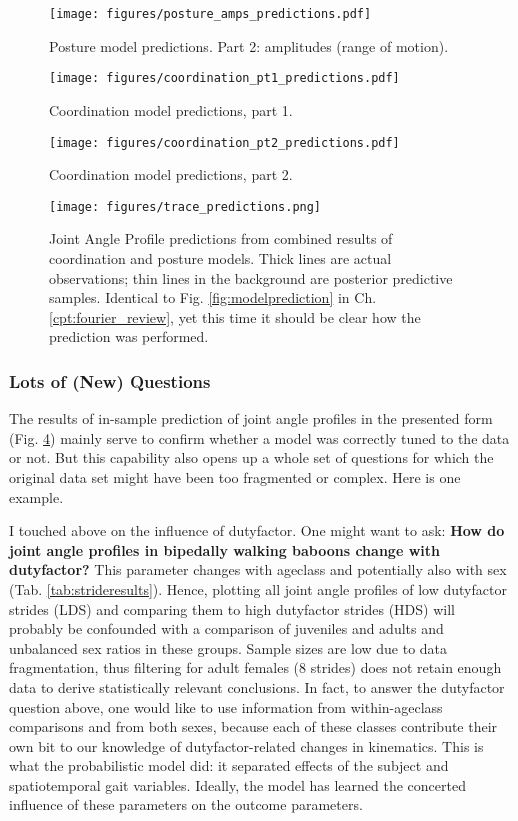 \begin{figure}[h!]
\centering
\texttt{[image: figures/posture\_amps\_predictions.pdf]}
\caption{\label{fig:posture2}Posture model predictions. Part 2: amplitudes (range of motion).}
\end{figure}

\begin{figure}[h!]
\centering
\texttt{[image: figures/coordination\_pt1\_predictions.pdf]}
\caption{\label{fig:coordination1}Coordination model predictions, part 1.}
\end{figure}

\begin{figure}[h!]
\centering
\texttt{[image: figures/coordination\_pt2\_predictions.pdf]}
\caption{\label{fig:coordination2}Coordination model predictions, part 2.}
\end{figure}


\begin{figure}[h!]
\centering
\texttt{[image: figures/trace\_predictions.png]}
\caption{\label{fig:japprediction}Joint Angle Profile predictions from combined results of coordination and posture models. Thick lines are actual observations; thin lines in the background are posterior predictive samples. Identical to Fig. \ref{fig:modelprediction} in Ch. \ref{cpt:fourier_review}, yet this time it should be clear how the prediction was performed.}
\end{figure}


\FloatBarrier\clearpage
\subsubsection{Lots of (New) Questions}
\label{sec:orgc1e641b}
The results of in-sample prediction of joint angle profiles in the presented form (Fig. \ref{fig:japprediction}) mainly serve to confirm whether a model was correctly tuned to the data or not.
But this capability also opens up a whole set of questions for which the original data set might have been too fragmented or complex.
Here is one example.


I touched above on the influence of dutyfactor.
One might want to ask:
\textbf{How do joint angle profiles in bipedally walking baboons change with dutyfactor?}
This parameter changes with ageclass and potentially also with sex (Tab. \ref{tab:strideresults}).
Hence, plotting all joint angle profiles of low dutyfactor strides (LDS) and comparing them to high dutyfactor strides (HDS) will probably be confounded with a comparison of juveniles and adults and unbalanced sex ratios in these groups.
Sample sizes are low due to data fragmentation, thus filtering for adult females (8 strides) does not retain enough data to derive statistically relevant conclusions.
In fact, to answer the dutyfactor question above, one would like to use information from within-ageclass comparisons and from both sexes, because each of these classes contribute their own bit to our knowledge of dutyfactor-related changes in kinematics.
This is what the probabilistic model did: it separated effects of the subject and spatiotemporal gait variables.
Ideally, the model has learned the concerted influence of these parameters on the outcome parameters.


